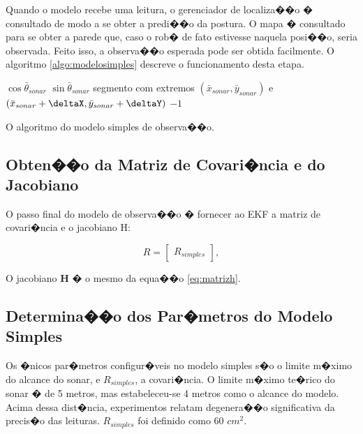 Quando o modelo recebe uma leitura, o gerenciador de localiza��o � consultado de modo a se obter a predi��o da postura. O mapa � consultado para se obter a parede que, caso o rob� de fato estivesse naquela posi��o, seria observada. Feito isso, a observa��o esperada pode ser obtida facilmente. O algoritmo \ref{algo:modelosimples} descreve o funcionamento desta etapa.

\begin{algorithm}[h]
\dontprintsemicolon
	
	\deltaX \recebe \tamanho * $\cos\bar{\theta}_{sonar}$ \;
	\deltaY \recebe \tamanho * $\sin\bar{\theta}_{sonar}$ \;
	\feixe \recebe segmento com extremos $(\bar{x}_{sonar}, \bar{y}_{sonar})$ e $(\bar{x}_{sonar} + \deltaX, \bar{y}_{sonar} + \deltaY)$ \;
	\distmin \recebe $-1$ \;
	
	\caption{O algoritmo do modelo simples de observa��o.}
	\label{algo:modelosimples}
\end{algorithm}

\subsection{Obten��o da Matriz de Covari�ncia e do Jacobiano}
O passo final do modelo de observa��o � fornecer ao EKF a matriz de covari�ncia e o jacobiano H:

\begin{equation}
R = \begin{bmatrix}
	R_{simples}
\end{bmatrix},
\end{equation}

O jacobiano $\bm{H}$ � o mesmo da equa��o \ref{eq:matrizh}.

\subsection{Determina��o dos Par�metros do Modelo Simples}

Os �nicos par�metros configur�veis no modelo simples s�o o limite m�ximo do alcance do sonar, e $R_{simples}$, a covari�ncia. O limite m�ximo te�rico do sonar � de 5 metros, mas estabeleceu-se 4 metros como o alcance do modelo. Acima dessa dist�ncia, experimentos relatam degenera��o significativa da precis�o das leituras. $R_{simples}$ foi definido como 60 $cm^2$.



%